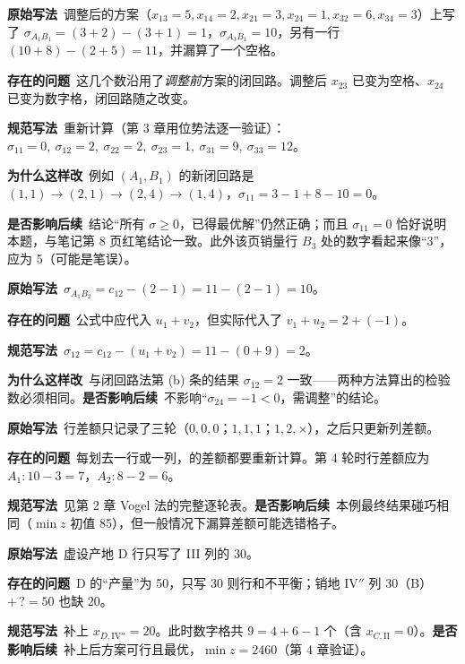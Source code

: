 \begin{correctionbox}[2. 调整后方案的检验数（第 7 页）]
\textbf{原始写法}\ 调整后的方案（$x_{13}=5,x_{14}=2,x_{21}=3,x_{24}=1,x_{32}=6,x_{34}=3$）上写了 $\sigma_{A_1B_1}=(3+2)-(3+1)=1$，$\sigma_{A_3B_1}=10$，另有一行 $(10+8)-(2+5)=11$，并漏算了一个空格。\par
\textbf{存在的问题}\ 这几个数沿用了\emph{调整前}方案的闭回路。调整后 $x_{23}$ 已变为空格、$x_{24}$ 已变为数字格，闭回路随之改变。\par
\textbf{规范写法}\ 重新计算（第 3 章用位势法逐一验证）：
$\sigma_{11}=0,\ \sigma_{12}=2,\ \sigma_{22}=2,\ \sigma_{23}=1,\ \sigma_{31}=9,\ \sigma_{33}=12$。\par
\textbf{为什么这样改}\ 例如 $(A_1,B_1)$ 的新闭回路是 $(1,1)\to(2,1)\to(2,4)\to(1,4)$，$\sigma_{11}=3-1+8-10=0$。\par
\textbf{是否影响后续}\ 结论“所有 $\sigma\ge0$，已得最优解”仍然正确；而且 $\sigma_{11}=0$ 恰好说明本题，与笔记第 8 页红笔结论一致。此外该页销量行 $B_3$ 处的数字看起来像“3”，应为 5（可能是笔误）。
\end{correctionbox}

\begin{correctionbox}
\textbf{原始写法}\ $\sigma_{A_1B_2}=c_{12}-(2-1)=11-(2-1)=10$。\par
\textbf{存在的问题}\ 公式中应代入 $u_1+v_2$，但实际代入了 $v_1+u_2=2+(-1)$。\par
\textbf{规范写法}\ $\sigma_{12}=c_{12}-(u_1+v_2)=11-(0+9)=2$。\par
\textbf{为什么这样改}\ 与闭回路法第 (b) 条的结果 $\sigma_{12}=2$ 一致——两种方法算出的检验数必须相同。\quad\textbf{是否影响后续}\ 不影响“$\sigma_{24}=-1<0$，需调整”的结论。
\end{correctionbox}

\begin{correctionbox}
\textbf{原始写法}\ 行差额只记录了三轮（$0,0,0$；$1,1,1$；$1,2,\times$），之后只更新列差额。\par
\textbf{存在的问题}\ 每划去一行或一列，的差额都要重新计算。第 4 轮时行差额应为 $A_1:10-3=7$，$A_2:8-2=6$。\par
\textbf{规范写法}\ 见第 2 章 Vogel 法的完整逐轮表。\quad\textbf{是否影响后续}\ 本例最终结果碰巧相同（$\min z$ 初值 85），但一般情况下漏算差额可能选错格子。
\end{correctionbox}

\begin{correctionbox}[5. 例 2 最终方案缺一个数字（第 12 页）]
\textbf{原始写法}\ 虚设产地 D 行只写了 III 列的 30。\par
\textbf{存在的问题}\ D 的“产量”为 50，只写 30 则行和不平衡；销地 IV$''$ 列 $30$（B）$+\,?=50$ 也缺 20。\par
\textbf{规范写法}\ 补上 $x_{D,\mathrm{IV}''}=20$。此时数字格共 $9=4+6-1$ 个（含 $x_{C,\mathrm{II}}=0$）。\quad\textbf{是否影响后续}\ 补上后方案可行且最优，$\min z=2460$（第 4 章验证）。
\end{correctionbox}

